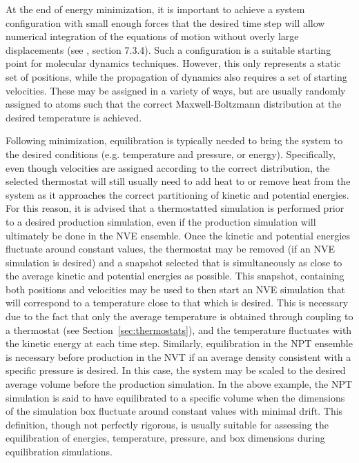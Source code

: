 \documentclass[9pt,bestpractices]{livecoms}
\begin{document}
At the end of energy minimization, it is important to achieve a system configuration with small enough forces that the desired time step will allow numerical integration of the equations of motion without overly large displacements (see \citet{LeachBook}, section 7.3.4).
Such a configuration is a suitable starting point for molecular dynamics techniques.
However, this only represents a static set of positions, while the propagation of dynamics also requires a set of starting velocities.
These may be assigned in a variety of ways, but are usually randomly assigned to atoms such that the correct Maxwell-Boltzmann distribution at the desired temperature is achieved.

Following minimization, equilibration is typically needed to bring the system to the desired conditions (e.g. temperature and pressure, or energy).
Specifically, even though velocities are assigned according to the correct distribution, the selected thermostat will still usually need to add heat to or remove heat from the system as it approaches the correct partitioning of kinetic and potential energies.
For this reason, it is advised that a thermostatted simulation is performed prior to a desired production simulation, even if the production simulation will ultimately be done in the NVE ensemble.
Once the kinetic and potential energies fluctuate around constant values, the thermostat may be removed (if an NVE simulation is desired) and a snapshot selected that is simultaneously as close to the average kinetic and potential energies as possible.
This snapshot, containing both positions and velocities may be used to then start an NVE simulation that will correspond to a temperature close to that which is desired.
This is necessary due to the fact that only the average temperature is obtained through coupling to a thermostat (see Section~\ref{sec:thermostats}), and the temperature fluctuates with the kinetic energy at each time step.
Similarly, equilibration in the NPT ensemble is necessary before production in the NVT if an average density consistent with a specific pressure is desired.
In this case, the system may be scaled to the desired average volume before the production simulation.
In the above example, the NPT simulation is said to have equilibrated to a specific volume when the dimensions of the simulation box fluctuate around constant values with minimal drift. 
This definition, though not perfectly rigorous, is usually suitable for assessing the equilibration of energies, temperature, pressure, and box dimensions during equilibration simulations.
\end{document}
